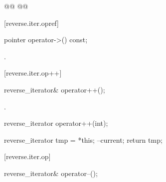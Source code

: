 \begin{itemdescr}
\pnum
\effects {}
\begin{codeblock}
@@
@@
\end{codeblock}

\end{itemdescr}

[reverse.iter.opref]{}

%
\begin{itemdecl}
pointer operator->() const;
\end{itemdecl}

\begin{itemdescr}
\pnum
\oldoldtxt{\returns}
.
\end{itemdescr}

[reverse.iter.op++]{}

%
\begin{itemdecl}
reverse_iterator& operator++();
\end{itemdecl}

\begin{itemdescr}
\pnum
\effects
{}

\pnum
\returns
{}.
\end{itemdescr}

%
%
\begin{itemdecl}
reverse_iterator operator++(int);
\end{itemdecl}

\begin{itemdescr}
\pnum
\effects
\begin{codeblock}
reverse_iterator tmp = *this;
--current;
return tmp;
\end{codeblock}
\end{itemdescr}

[reverse.iter.op\dcr]{}

%
\begin{itemdecl}
reverse_iterator& operator--();
\end{itemdecl}

